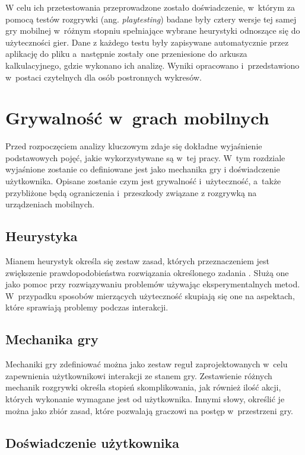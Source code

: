 \documentclass[a4paper,12pt,numbers=noenddot]{report}
\begin{document}
W celu ich przetestowania przeprowadzone zostało doświadczenie, w~którym za pomocą testów rozgrywki (ang. \textit{playtesting}) badane były cztery wersje tej samej gry mobilnej w~różnym stopniu spełniające wybrane heurystyki odnoszące się do użyteczności gier. Dane z każdego testu były zapisywane automatycznie przez aplikację do pliku a~następnie zostały one przeniesione do arkusza kalkulacyjnego, gdzie wykonano ich analizę. Wyniki opracowano i~przedstawiono w~postaci czytelnych dla osób postronnych wykresów.


\chapter{Grywalność w~grach mobilnych}
Przed rozpoczęciem analizy kluczowym zdaje się dokładne wyjaśnienie podstawowych pojęć, jakie wykorzystywane są w~tej pracy. W~tym rozdziale wyjaśnione zostanie co definiowane jest jako mechanika gry i doświadczenie użytkownika. Opisane zostanie czym jest grywalność i~użyteczność, a~także przybliżone będą ograniczenia i~przeszkody związane z rozgrywką na urządzeniach mobilnych.

\section{Heurystyka}
Mianem heurystyk określa się zestaw zasad, których przeznaczeniem jest zwiększenie prawdopodobieństwa rozwiązania określonego zadania \cite{art_WithHeuristic}. Służą one jako pomoc przy rozwiązywaniu problemów używając eksperymentalnych metod. W~przypadku sposobów mierzących użyteczność skupiają się one na aspektach, które sprawiają problemy podczas interakcji\cite{art_Nielsen}\cite{art_evaluatingPlayabilityMG}. 

\section{Mechanika gry}
Mechaniki gry zdefiniować można jako zestaw reguł zaprojektowanych w~celu zapewnienia użytkownikowi interakcji ze stanem gry. Zestawienie różnych mechanik rozgrywki określa stopień skomplikowania, jak również ilość akcji, których wykonanie wymagane jest od użytkownika. Innymi słowy, określić je można jako zbiór zasad, które pozwalają graczowi na postęp w~przestrzeni gry. \cite{online_GameMechanics}

\section{Doświadczenie użytkownika}
\end{document}
